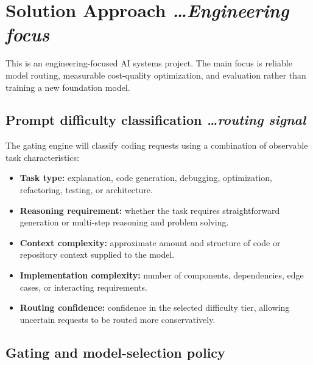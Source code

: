 \documentclass[11pt,a4paper]{article}
\newcommand{\BvrHint}[1]{%
  {\normalfont\normalsize\itshape\hfill #1}%
}
\begin{document}
\section{Solution Approach%
  \texorpdfstring{\BvrHint{\ldots Engineering focus}}{}}

This is an engineering-focused AI systems project. The main
focus is reliable model routing, measurable cost-quality
optimization, and evaluation rather than training a new
foundation model.

\subsection{Prompt difficulty classification%
  \texorpdfstring{\BvrHint{\ldots routing signal}}{}}

The gating engine will classify coding requests using a
combination of observable task characteristics:

\begin{itemize}[leftmargin=0.7cm]

    \item \textbf{Task type:} explanation, code generation,
    debugging, optimization, refactoring, testing, or
    architecture.

    \item \textbf{Reasoning requirement:} whether the task
    requires straightforward generation or multi-step
    reasoning and problem solving.

    \item \textbf{Context complexity:} approximate amount and
    structure of code or repository context supplied to the
    model.

    \item \textbf{Implementation complexity:} number of
    components, dependencies, edge cases, or interacting
    requirements.

    \item \textbf{Routing confidence:} confidence in the
    selected difficulty tier, allowing uncertain requests
    to be routed more conservatively.

\end{itemize}

\subsection{Gating and model-selection policy}
\end{document}
